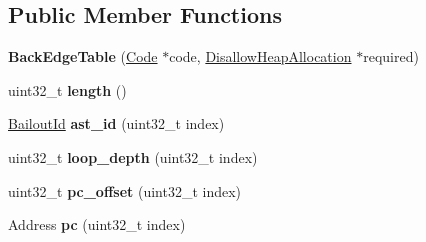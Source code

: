 \subsection*{Public Member Functions}
\begin{DoxyCompactItemize}
\item 
{\bfseries Back\+Edge\+Table} (\hyperlink{classv8_1_1internal_1_1_code}{Code} $\ast$code, \hyperlink{classv8_1_1internal_1_1_per_thread_assert_scope_debug_only}{Disallow\+Heap\+Allocation} $\ast$required)\hypertarget{classv8_1_1internal_1_1_back_edge_table_a7db2b9b7aa7720c9ed264ad8514f590e}{}\label{classv8_1_1internal_1_1_back_edge_table_a7db2b9b7aa7720c9ed264ad8514f590e}

\item 
uint32\+\_\+t {\bfseries length} ()\hypertarget{classv8_1_1internal_1_1_back_edge_table_a56b23e90b541646f83902eb5e8653205}{}\label{classv8_1_1internal_1_1_back_edge_table_a56b23e90b541646f83902eb5e8653205}

\item 
\hyperlink{classv8_1_1internal_1_1_bailout_id}{Bailout\+Id} {\bfseries ast\+\_\+id} (uint32\+\_\+t index)\hypertarget{classv8_1_1internal_1_1_back_edge_table_ad2833701689e96f451ab733f1fea52a3}{}\label{classv8_1_1internal_1_1_back_edge_table_ad2833701689e96f451ab733f1fea52a3}

\item 
uint32\+\_\+t {\bfseries loop\+\_\+depth} (uint32\+\_\+t index)\hypertarget{classv8_1_1internal_1_1_back_edge_table_a4385d5f565fb0623ec77a3e150f5b770}{}\label{classv8_1_1internal_1_1_back_edge_table_a4385d5f565fb0623ec77a3e150f5b770}

\item 
uint32\+\_\+t {\bfseries pc\+\_\+offset} (uint32\+\_\+t index)\hypertarget{classv8_1_1internal_1_1_back_edge_table_a287333d13fd7c286ff7751a1c0465d75}{}\label{classv8_1_1internal_1_1_back_edge_table_a287333d13fd7c286ff7751a1c0465d75}

\item 
Address {\bfseries pc} (uint32\+\_\+t index)\hypertarget{classv8_1_1internal_1_1_back_edge_table_aea67e907fbd52b3fe1762f8a6c333259}{}\label{classv8_1_1internal_1_1_back_edge_table_aea67e907fbd52b3fe1762f8a6c333259}

\end{DoxyCompactItemize}
